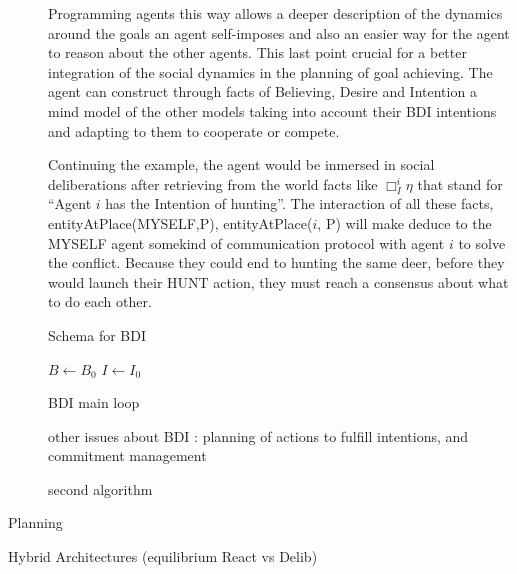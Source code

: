 \documentclass{report}
\begin{document}
\begin{description}
\begin{description}
		Programming agents this way allows a deeper description of the dynamics around the goals an agent 
		self-imposes and also an easier way for the agent to reason about the other agents. This last point
		crucial for a better integration of the social dynamics in the planning of goal achieving. The agent
		can construct through facts of Believing, Desire and Intention a mind model of the other models taking
		into account their BDI intentions and adapting to them to cooperate or compete. 

		Continuing the example, the agent would be inmersed in social deliberations after retrieving from the
		world facts like $\Box_{I}^i \eta$ that stand for ``Agent $i$ has the Intention of hunting''. The 
		interaction of all these facts, entityAtPlace(MYSELF,P), entityAtPlace($i$, P) will make deduce to the
		MYSELF agent somekind of communication protocol with agent $i$ to solve the conflict. Because they could 
		end to hunting the same deer, before they would launch their HUNT action, they must reach a consensus about
		what to do each other. 

		Schema for BDI	


		\begin{algorithm}[H]
		\SetAlgoLined
		\BlankLine
		$B \gets B_0$\;
		$I \gets I_0$\;
		\caption{BDI main loop}
		\end{algorithm}


		other issues about BDI : planning of actions to fulfill intentions, and commitment management

		second algorithm

		\item [Planning]


	\end{description}

	\item Hybrid Architectures (equilibrium React vs Delib)
		
\end{description}


\end{document}
